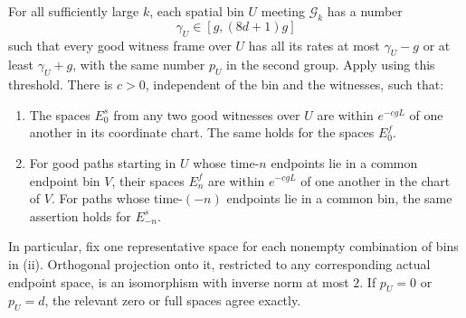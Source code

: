 \begin{lemma}\label{lem:bin-spaces}
For all sufficiently large $k$, each spatial bin $U$ meeting
$\mathcal G_k$ has a number
\[
 \gamma_U\in[g,(8d+1)g]
\]
such that every good witness frame over $U$ has all its rates at most
$\gamma_U-g$ or at least $\gamma_U+g$, with the same number $p_U$
in the second group.
Apply  using this threshold.
There is $c>0$, independent of the bin and the witnesses, such that:
\begin{enumerate}[label=\textup{(\roman*)}]
 \item The spaces $E_0^s$ from any two good witnesses over $U$ are
 within $e^{-c gL}$ of one another in its coordinate chart.
 The same holds for the spaces $E_0^f$.
 \item For good paths starting in $U$ whose time-$n$ endpoints lie
 in a common endpoint bin $V$, their spaces $E_n^f$ are within
 $e^{-c gL}$ of one another in the chart of $V$.
 For paths whose time-$(-n)$ endpoints lie in a common bin,
 the same assertion holds for $E_{-n}^s$.
\end{enumerate}
In particular, fix one representative space for each nonempty
combination of bins in \textup{(ii)}.  Orthogonal projection onto it,
restricted to any corresponding actual endpoint space, is an
isomorphism with inverse norm at most $2$.
If $p_U=0$ or $p_U=d$, the relevant zero or full spaces agree exactly.
\end{lemma}

